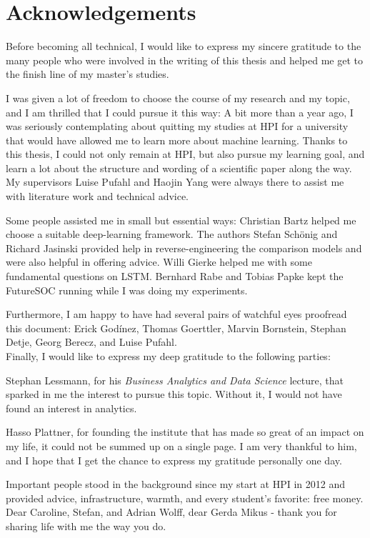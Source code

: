 
\begingroup

\let\clearpage\relax
\let\cleardoublepage\relax
\let\cleardoublepage\relax

\chapter*{Acknowledgements}
Before becoming all technical, I would like to express my sincere gratitude to the many people who were involved in the writing of this thesis and helped me get to the finish line of my master's studies.

I was given a lot of freedom to choose the course of my research and my topic, and I am thrilled that I could pursue it this way:
A bit more than a year ago,  I was seriously contemplating about quitting my studies at HPI for a university that would have allowed me to learn more about machine learning.
Thanks to this thesis, I could not only remain at HPI, but also pursue my learning goal, and learn a lot about the structure and wording of a scientific paper along the way. My supervisors Luise Pufahl and Haojin Yang were always there to assist me with literature work and technical advice.

Some people assisted me in small but essential ways:
Christian Bartz helped me choose a suitable deep-learning framework.
The authors Stefan Schönig and Richard Jasinski provided help in reverse-engineering the comparison models and were also helpful in offering advice.
Willi Gierke helped me with some fundamental questions on LSTM.
Bernhard Rabe and Tobias Papke kept the FutureSOC running while I was doing my experiments.

Furthermore, I am happy to have had several pairs of watchful eyes proofread this document:
Erick Godínez, Thomas Goerttler, Marvin Bornstein, Stephan Detje, Georg Berecz, and Luise Pufahl.\\

Finally, I would like to express my deep gratitude to the following parties:

Stephan Lessmann, for his \textit{Business Analytics and Data Science} lecture, that sparked in me the interest to pursue this topic. Without it, I would not have found an interest in analytics.

Hasso Plattner, for founding the institute that has made so great of an impact on my life, it could not be summed up on a single page.
I am very thankful to him, and I hope that I get the chance to express my gratitude personally one day.

Important people stood in the background since my start at HPI in 2012 and provided advice, infrastructure, warmth, and every student's favorite: free money. Dear Caroline, Stefan, and Adrian Wolff, dear Gerda Mikus - thank you for sharing life with me the way you do.
\endgroup
